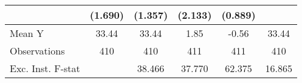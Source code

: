 {\begin{tabular}{l*{5}{c}}
            &     (1.690)         &     (1.357)         &     (2.133)         &     (0.889)         &                     \\
\midrule
Mean Y      &       33.44         &       33.44         &        1.85         &       -0.56         &       33.44         \\
Observations&         410         &         410         &         411         &         411         &         410         \\
Exc. Inst. F-stat&                     &      38.466         &      37.770         &      62.375         &      16.865         \\
\bottomrule
\end{tabular}
}
